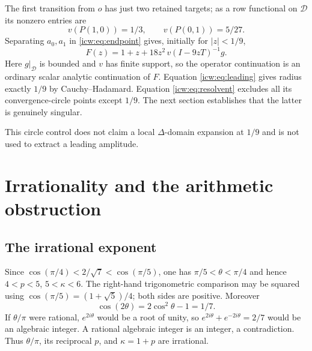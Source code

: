 \documentclass[11pt,letterpaper]{article}
\theoremstyle{remark}\newtheorem{remark}[theorem]{Remark}
\newcommand{\1}{\mathbf1}
\begin{document}
The first transition from $o$ has just two retained targets; as a row
functional on $\mathcal D$ its nonzero entries are
\[
 v(P(1,0))=1/3,\qquad v(P(0,1))=5/27.
\]
Separating $a_0,a_1$ in \eqref{icw:eq:endpoint} gives, initially for
$|z|<1/9$,
\begin{equation}\label{icw:eq:Fres}
 F(z)=1+z+18z^2\,v(I-9zT)^{-1}g.
\end{equation}
Here $g|_{\mathcal D}$ is bounded and $v$ has finite support, so the
operator continuation is an ordinary scalar analytic continuation of
$F$. Equation \eqref{icw:eq:leading} gives radius exactly $1/9$ by
Cauchy--Hadamard. Equation \eqref{icw:eq:resolvent} excludes all its
convergence-circle points except $1/9$. The next section establishes
that the latter is genuinely singular.

This circle control does not claim a local $\Delta$-domain expansion at
$1/9$ and is not used to extract a leading amplitude.

\section{Irrationality and the arithmetic obstruction}\label{icw:sec:arith}
\subsection{The irrational exponent}
Since $\cos(\pi/4)<2/\sqrt7<\cos(\pi/5)$, one has
$\pi/5<\theta<\pi/4$ and hence $4<p<5$, $5<\kappa<6$.
The right-hand trigonometric comparison may be squared using
$\cos(\pi/5)=(1+\sqrt5)/4$; both sides are positive.
Moreover
\[
 \cos(2\theta)=2\cos^2\theta-1=1/7.
\]
If $\theta/\pi$ were rational, $e^{2i\theta}$ would be a root of unity,
so $e^{2i\theta}+e^{-2i\theta}=2/7$ would be an algebraic integer.
A rational algebraic integer is an integer, a contradiction. Thus
$\theta/\pi$, its reciprocal $p$, and $\kappa=1+p$ are irrational.
\end{document}
